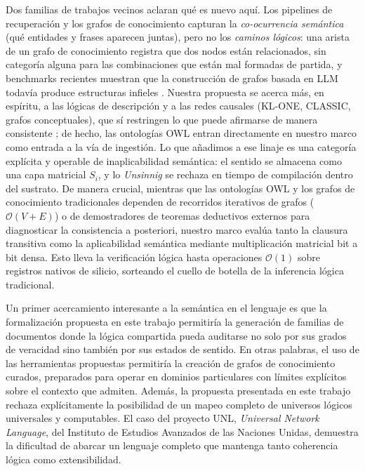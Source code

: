 \documentclass{article}
\begin{document}
Dos familias de trabajos vecinos aclaran qué es nuevo aquí. Los
pipelines de recuperación y los grafos de conocimiento capturan la
\emph{co-ocurrencia semántica} (qué entidades y frases aparecen juntas),
pero no los \emph{caminos lógicos}: una arista de un grafo de
conocimiento registra que dos nodos están relacionados, sin categoría
alguna para las combinaciones que están mal formadas de partida, y
benchmarks recientes muestran que la construcción de grafos basada en
LLM todavía produce estructuras infieles \citep{sansford2024grapheval}.
Nuestra propuesta se acerca más, en espíritu, a las lógicas de
descripción y a las redes causales (KL-ONE, CLASSIC, grafos
conceptuales), que sí restringen lo que puede afirmarse de manera
consistente
\citep{brachman1990, lehmann1992, sowa1991, kruse2022causal}; de hecho,
las ontologías OWL entran directamente en nuestro marco como entrada a
la vía de ingestión. Lo que añadimos a ese linaje es una categoría
explícita y operable de inaplicabilidad semántica: el sentido se
almacena como una capa matricial \(S_i\), y lo \emph{Unsinnig} se
rechaza en tiempo de compilación dentro del sustrato. De manera crucial,
mientras que las ontologías OWL y los grafos de conocimiento
tradicionales dependen de recorridos iterativos de grafos
(\(\mathcal{O}(V+E)\)) o de demostradores de teoremas deductivos
externos para diagnosticar la consistencia a posteriori, nuestro marco
evalúa tanto la clausura transitiva como la aplicabilidad semántica
mediante multiplicación matricial bit a bit densa. Esto lleva la
verificación lógica hasta operaciones \(\mathcal{O}(1)\) sobre registros
nativos de silicio, sorteando el cuello de botella de la inferencia
lógica tradicional.

Un primer acercamiento interesante a la semántica en el lenguaje es que
la formalización propuesta en este trabajo permitiría la generación de
familias de documentos donde la lógica compartida pueda auditarse no
solo por sus grados de veracidad sino también por sus estados de
sentido. En otras palabras, el uso de las herramientas propuestas
permitiría la creación de grafos de conocimiento curados, preparados
para operar en dominios particulares con límites explícitos sobre el
contexto que admiten. Además, la propuesta presentada en este trabajo
rechaza explícitamente la posibilidad de un mapeo completo de universos
lógicos universales y computables. El caso del proyecto UNL,
\emph{Universal Network Language}, del Instituto de Estudios Avanzados
de las Naciones Unidas, demuestra la dificultad de abarcar un lenguaje
completo que mantenga tanto coherencia lógica como extensibilidad.
\end{document}
